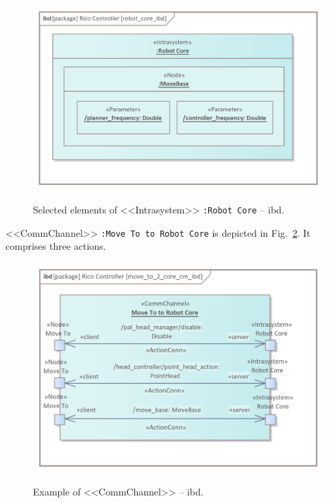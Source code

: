\documentclass{ieeeaccess}
\begin{document}
	\begin{figure}[htb]
		\centering
		\begin{center}
			{\includegraphics[scale=0.7]{img/rico_pkg/robot_core_ibd.png}}
		\end{center}
		\caption{Selected elements of <<Intrasystem>> \texttt{:Robot Core} -- ibd.} 
		\label{fig:robot_core_ibd}
	\end{figure}
	
			
	<<CommChannel>> \texttt{:Move To to Robot Core} is depicted in Fig.~\ref{fig:move_to_2_core_cm_ibd}. It comprises three actions.
	
	\begin{figure}[htb]
		\centering
		\begin{center}
			{\includegraphics[width=\columnwidth]{img/rico_pkg/move_to_2_core_cm_ibd.png}}
		\end{center}
		\caption{Example of <<CommChannel>> -- ibd.} 
		\label{fig:move_to_2_core_cm_ibd}
	\end{figure}
	
\end{document}
